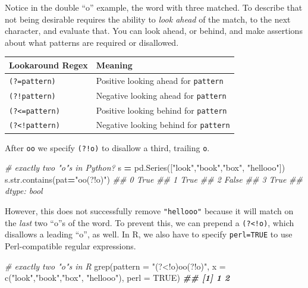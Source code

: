 \documentclass[
  12pt,
  krantz2]{krantz}
\makeatletter
\newenvironment{Shaded}{\begin{snugshade}}{\end{snugshade}}
\newcommand{\AttributeTok}[1]{\textcolor[rgb]{0.61,0.61,0.61}{#1}}
\newcommand{\BuiltInTok}[1]{#1}
\newcommand{\CommentTok}[1]{\textcolor[rgb]{0.37,0.37,0.37}{\textit{#1}}}
\newcommand{\ConstantTok}[1]{\textcolor[rgb]{0,0,0}{#1}}
\newcommand{\DocumentationTok}[1]{\textcolor[rgb]{0.37,0.37,0.37}{\textbf{\textit{#1}}}}
\newcommand{\FunctionTok}[1]{\textcolor[rgb]{0,0,0}{#1}}
\newcommand{\NormalTok}[1]{#1}
\newcommand{\OperatorTok}[1]{\textcolor[rgb]{0.43,0.43,0.43}{\textbf{#1}}}
\newcommand{\StringTok}[1]{\textcolor[rgb]{0.5,0.5,0.5}{#1}}
\newenvironment{kframe}{%
\medskip{}
\setlength{\fboxsep}{.8em}
 \def\at@end@of@kframe{}%
 \ifinner\ifhmode%
  \def\at@end@of@kframe{\end{minipage}}%
  \begin{minipage}{\columnwidth}%
 \fi\fi%
 \def\FrameCommand##1{\hskip\@totalleftmargin \hskip-\fboxsep
 \colorbox{shadecolor}{##1}\hskip-\fboxsep
     \hskip-\linewidth \hskip-\@totalleftmargin \hskip\columnwidth}%
 \MakeFramed {\advance\hsize-\width
   \@totalleftmargin\z@ \linewidth\hsize
   \@setminipage}}%
 {\par\unskip\endMakeFramed%
 \at@end@of@kframe}
\renewenvironment{Shaded}{\begin{kframe}}{\end{kframe}}
\makeatother
\begin{document}
Notice in the double ``o'' example, the word with three matched. To describe that not being desirable requires the ability to \emph{look ahead} of the match, to the next character, and evaluate that. You can look ahead, or behind, and make assertions about what patterns are required or disallowed.

\begin{longtable}[]{@{}ll@{}}
\toprule
Lookaround Regex & Meaning \\
\midrule
\endhead
\texttt{(?=pattern)} & Positive looking ahead for \texttt{pattern} \\
\texttt{(?!pattern)} & Negative looking ahead for \texttt{pattern} \\
\texttt{(?\textless{}=pattern)} & Positive looking behind for \texttt{pattern} \\
\texttt{(?\textless{}!pattern)} & Negative looking behind for \texttt{pattern} \\
\bottomrule
\end{longtable}

After \texttt{oo} we specify \texttt{(?!o)} to disallow a third, trailing \texttt{o}.

\begin{Shaded}
\begin{Highlighting}[]
\CommentTok{\# exactly two "o"s in Python?}
\NormalTok{s }\OperatorTok{=}\NormalTok{ pd.Series([}\StringTok{"look"}\NormalTok{,}\StringTok{"book"}\NormalTok{,}\StringTok{"box"}\NormalTok{, }\StringTok{"hellooo"}\NormalTok{])}
\NormalTok{s.}\BuiltInTok{str}\NormalTok{.contains(pat}\OperatorTok{=}\StringTok{"oo(?!o)"}\NormalTok{)}
\CommentTok{\#\# 0     True}
\CommentTok{\#\# 1     True}
\CommentTok{\#\# 2    False}
\CommentTok{\#\# 3     True}
\CommentTok{\#\# dtype: bool}
\end{Highlighting}
\end{Shaded}

However, this does not successfully remove \texttt{"hellooo"} because it will match on the \emph{last} two ``o''s of the word. To prevent this, we can prepend a \texttt{(?\textless{}!o)}, which disallows a leading ``o'', as well. In R, we also have to specify \texttt{perl=TRUE} to use Perl-compatible regular expressions.

\begin{Shaded}
\begin{Highlighting}[]
\CommentTok{\# exactly two "o"s in R}
\FunctionTok{grep}\NormalTok{(}\AttributeTok{pattern =} \StringTok{"(?\textless{}!o)oo(?!o)"}\NormalTok{, }
     \AttributeTok{x =} \FunctionTok{c}\NormalTok{(}\StringTok{"look"}\NormalTok{,}\StringTok{"book"}\NormalTok{,}\StringTok{"box"}\NormalTok{, }\StringTok{"hellooo"}\NormalTok{), }\AttributeTok{perl =} \ConstantTok{TRUE}\NormalTok{)}
\DocumentationTok{\#\# [1] 1 2}
\end{Highlighting}
\end{Shaded}
\end{document}

